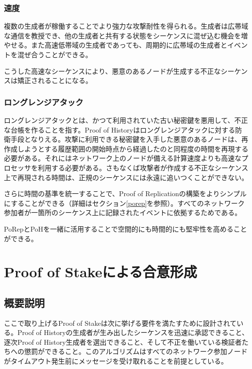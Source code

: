 \documentclass[12pt]{ltjsarticle}
\begin{document}
\subsubsection{速度}
複数の生成者が稼働することでより強力な攻撃耐性を得られる。生成者は広帯域な通信を教授でき、他の生成者と共有する状態をシーケンスに混ぜ込む機会を増やせる。また高速低帯域の生成者であっても、周期的に広帯域の生成者とイベントを混ぜ合うことができる。

こうした高速なシーケンスにより、悪意のあるノードが生成する不正なシーケンスは矯正されることになる。

\subsubsection{ロングレンジアタック}

ロングレンジアタックとは、かつて利用されていた古い秘密鍵を悪用して、不正な台帳を作ることを指す\cite{casper}。Proof of Historyはロングレンジアタックに対する防衛手段となりえる。攻撃に利用できる秘密鍵を入手した悪意のあるノードは、再作成しようとする履歴範囲の開始時点から経過したのと同程度の時間を再現する必要がある。それにはネットワーク上のノードが備える計算速度よりも高速なプロセッサを利用する必要がある。さもなくば攻撃者が作成する不正なシーケンス上で再現される時間は、正規のシーケンスには永遠に追いつくことができない。

さらに時間の基準を統一することで、Proof of Replicationの構築をよりシンプルにすることができる（詳細はセクション\ref{porep}を参照）。すべてのネットワーク参加者が一箇所のシーケンス上に記録されたイベントに依拠するためである。

PoRepとPoHを一緒に活用することで空間的にも時間的にも堅牢性を高めることができる。


\section{Proof of Stakeによる合意形成}\label{proof_of_stake}
\subsection{概要説明}
ここで取り上げるProof of Stakeは次に挙げる要件を満たすために設計されている。Proof of Historyの生成者が生み出したシーケンスを迅速に承認できること、逐次Proof of History生成者を選出できること、そして不正を働いている検証者たちへの懲罰ができること。このアルゴリズムはすべてのネットワーク参加ノードがタイムアウト発生前にメッセージを受け取れることを前提としている。
\end{document}
